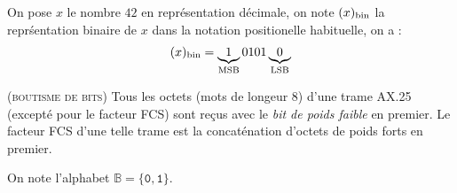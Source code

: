 \documentclass[twocolumn,pre,floats,aps,amsmath,amssymb]{revtex4}
\newenvironment{example}[1][Exemple.]{\begin{trivlist}
\item[\hskip \labelsep {\bfseries #1}]}{\end{trivlist}}
\newenvironment{remark}[1][Remarque.]{\begin{trivlist}
\item[\hskip \labelsep {\bfseries #1}]}{\end{trivlist}}
\begin{document}
\begin{example}
  On pose $x$ le nombre $42$ en repr\'esentation d\'ecimale, on note $(x)_{\textup{bin}}$ la repr\'sentation binaire de $x$ dans la notation positionelle habituelle, on a :
\begin{eqnarray*}
  (x)_{\textup{bin}} = \underbrace{1}_{\textup{MSB}}0101\underbrace{0}_{\textup{LSB}}
\end{eqnarray*}

\end{example}

\begin{remark}
  (\textsc{boutisme de bits})
  Tous les octets (mots de longeur 8) d'une trame AX.25 (except\'e pour le facteur FCS) sont re\c{c}us avec le \textit{bit de poids faible} en premier\cite{IITB}. Le facteur FCS d'une telle trame est la concat\'enation d'octets de poids forts en premier.
\end{remark}

On note l'alphabet $\mathbb{B} = \{\texttt{0}, \texttt{1}\}$.
\end{document}
